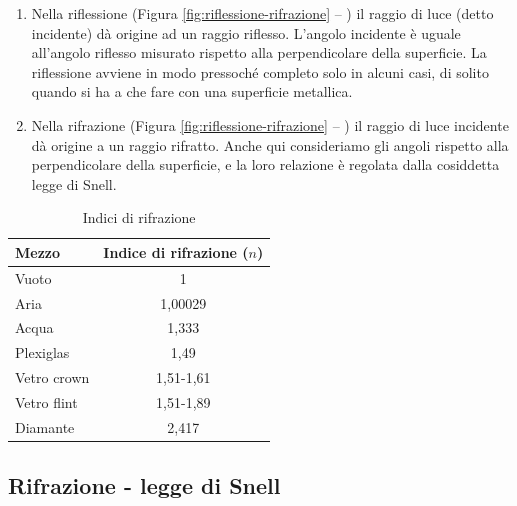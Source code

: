 \begin{enumerate}
\item Nella riflessione (Figura \ref{fig:riflessione-rifrazione} -- ) il raggio di luce (detto incidente) dà origine ad un raggio riflesso. L'angolo incidente è uguale all'angolo riflesso misurato rispetto alla perpendicolare della superficie. La
riflessione avviene in modo pressoché completo solo in alcuni casi, di solito quando si ha a che fare
con una superficie metallica.
\item Nella rifrazione (Figura \ref{fig:riflessione-rifrazione} -- ) il raggio di luce incidente dà origine a un raggio rifratto. Anche qui
consideriamo gli angoli rispetto alla perpendicolare della superficie, e la loro relazione è regolata
dalla cosiddetta legge di Snell.
\end{enumerate}


\begin{table}
\centering
\begin{tabular}{l|c}

Mezzo & Indice di rifrazione ($n$) \\
\hline
Vuoto &1\\
Aria  &1,00029\\
Acqua &1,333\\
Plexiglas &1,49\\
Vetro crown &1,51-1,61\\
Vetro flint &1,51-1,89\\
Diamante &2,417\\
\end{tabular}

\caption{Indici di rifrazione}
\label{table:indici-rifrazione}

\end{table}

\subsection{Rifrazione - legge di Snell}


